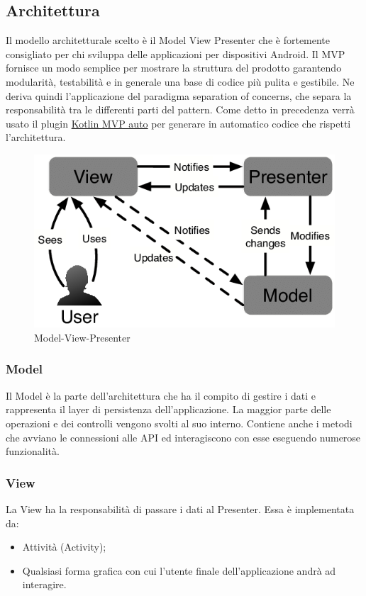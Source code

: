\subsection{Architettura}
Il modello architetturale scelto è il Model View Presenter che è fortemente consigliato per chi sviluppa delle applicazioni per dispositivi Android. Il MVP fornisce un modo semplice per mostrare la struttura del prodotto garantendo modularità, testabilità e in generale una base di codice più pulita e gestibile. Ne deriva quindi l'applicazione del paradigma separation of concerns, che separa la responsabilità tra le differenti parti del pattern.
Come detto in precedenza verrà usato il plugin \href{https://plugins.jetbrains.com/plugin/12265-kotlin-mvp-auto}{Kotlin MVP auto} per generare in automatico codice che rispetti l'architettura.
\begin{figure}[H]
	\centering
	\includegraphics[width=16cm]{res/images/mvp.png}
	\caption{Model-View-Presenter}
	\label{fig:Model-View-Presenter}
\end{figure}

\subsubsection{Model}
Il Model è la parte dell'architettura che ha il compito di gestire i dati e rappresenta il layer di persistenza dell'applicazione. La maggior parte delle operazioni e dei controlli vengono svolti al suo interno. Contiene anche i metodi che avviano le connessioni alle API ed interagiscono con esse eseguendo numerose funzionalità.


\subsubsection{View}
La View ha la responsabilità di passare i dati al Presenter. Essa è implementata da:
\begin{itemize}
	\item Attività (Activity); \\
	\item Qualsiasi forma grafica con cui l'utente finale dell'applicazione andrà ad interagire. \\	
\end{itemize}

